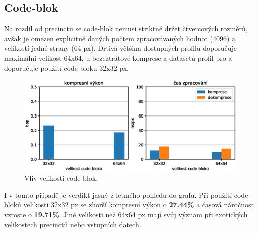 \subsection*{Code-blok}
Na rozdíl od precinctu se code-blok nemusí striktně držet čtvercových rozměrů, avšak je omezen explicitně daných počtem zpracovávaných hodnot (4096) a velikostí jedné strany (64 px). Drtivá většina dostupných profilu doporučuje maximální velikost 64x64, u bezeztrátové komprese a datasetů profil pro  a  doporučuje použití code-bloku 32x32 px. \\
\begin{figure}[hbt!]
  \centering
  \hspace*{-0.75cm}
  \includegraphics[width=16cm]{obrazky-figures/blocks/fotky_blocks.eps}
  \caption{Vliv velikosti code-blok.}
\end{figure}

\noindent I v tomto případě je verdikt jasný z letmého pohledu do grafu. Při použití code-bloků velikosti 32x32 px se zhorší kompresní výkon o \textbf{27.44\%} a časová náročnost vzroste o \textbf{19.71\%}. Jiné velikosti než 64x64 px mají svůj význam při exotických velikostech precinctů nebo vstupních datech.
\clearpage

%
%
\newpage
